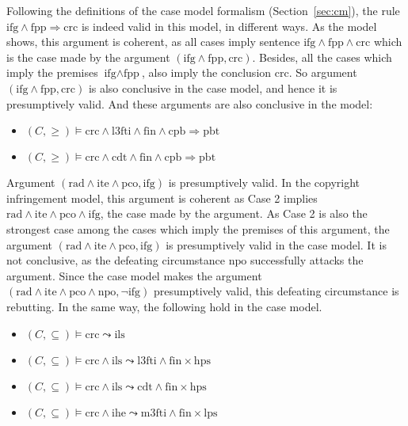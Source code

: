 \documentclass{IOS-Book-Article}
\begin{document}
Following the definitions of the case model formalism (Section~\ref{sec:cm}), the rule $\textrm{ifg} \wedge \textrm{fpp} \Rightarrow \textrm{crc}$ is indeed valid in this model, in different ways. As the model shows, this argument is coherent, as all cases imply sentence $\textrm{ifg} \wedge \textrm{fpp} \wedge \textrm{crc}$ which is the case made by the argument $(\textrm{ifg} \wedge \textrm{fpp}, \textrm{crc})$. Besides, all the cases which imply the premises $\textrm{ifg} \wedge \textrm{fpp}$, also imply the conclusion $\textrm{crc}$. So argument $(\textrm{ifg} \wedge \textrm{fpp}, \textrm{crc})$ is also conclusive in the case model, and hence it is presumptively valid. And these arguments are also conclusive in the model:

\begin{itemize}
\item $(C,  \geq) \models \textrm{crc} \wedge \textrm{l3fti} \wedge \textrm{fin} \wedge \textrm{cpb} \Rightarrow \textrm{pbt}$
\item $(C,  \geq) \models \textrm{crc} \wedge \textrm{cdt} \wedge \textrm{fin} \wedge \textrm{cpb} \Rightarrow \textrm{pbt}$
\end{itemize}

\noindent Argument $(\textrm{rad} \wedge \textrm{ite} \wedge \textrm{pco}, \textrm{ifg})$ is presumptively valid. In the copyright infringement model, this argument is coherent as Case 2 implies $\textrm{rad} \wedge \textrm{ite} \wedge \textrm{pco} \wedge \textrm{ifg}$, the case made by the argument. As Case 2 is also the strongest case among the cases which imply the premises of this argument, the argument $(\textrm{rad} \wedge \textrm{ite} \wedge \textrm{pco}, \textrm{ifg})$ is presumptively valid in the case model. It is not conclusive, as the defeating circumstance $\textrm{npo}$ successfully attacks the argument. Since the case model makes the argument $(\textrm{rad} \wedge \textrm{ite} \wedge \textrm{pco} \wedge \textrm{npo}, \neg \textrm{ifg})$ presumptively valid, this defeating circumstance is rebutting. In the same way, the following hold in the case model.

\begin{itemize}
\item $(C,  \subseteq) \models \textrm{crc} \leadsto \textrm{ils}$
\item $(C,  \subseteq) \models \textrm{crc} \wedge \textrm{ils} \leadsto \textrm{l3fti} \wedge \textrm{fin} \times \textrm{hps}$
\item $(C,  \subseteq) \models \textrm{crc} \wedge \textrm{ils} \leadsto \textrm{cdt} \wedge \textrm{fin} \times \textrm{hps}$
\item $(C,  \subseteq) \models \textrm{crc} \wedge \textrm{ihe} \leadsto \textrm{m3fti} \wedge \textrm{fin} \times \textrm{lps}$
\end{itemize}
\end{document}
